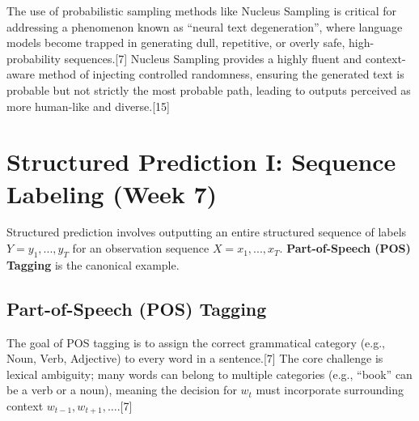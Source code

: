 \documentclass{article}
\begin{document}
The use of probabilistic sampling methods like Nucleus Sampling is critical for addressing a phenomenon known as ``neural text degeneration'', where language models become trapped in generating dull, repetitive, or overly safe, high-probability sequences.[7] Nucleus Sampling provides a highly fluent and context-aware method of injecting controlled randomness, ensuring the generated text is probable but not strictly the most probable path, leading to outputs perceived as more human-like and diverse.[15]

\begin{table}[h!]
\centering
\caption{Decoding Strategy Comparison}
\end{table}

\section{Structured Prediction I: Sequence Labeling (Week 7)}

Structured prediction involves outputting an entire structured sequence of labels $Y = y_1,..., y_T$ for an observation sequence $X = x_1,..., x_T$. \textbf{Part-of-Speech (POS) Tagging} is the canonical example.

\subsection{Part-of-Speech (POS) Tagging}

The goal of POS tagging is to assign the correct grammatical category (e.g., Noun, Verb, Adjective) to every word in a sentence.[7] The core challenge is lexical ambiguity; many words can belong to multiple categories (e.g., ``book'' can be a verb or a noun), meaning the decision for $w_t$ must incorporate surrounding context $w_{t-1}, w_{t+1}, \dots$.[7]
\end{document}
